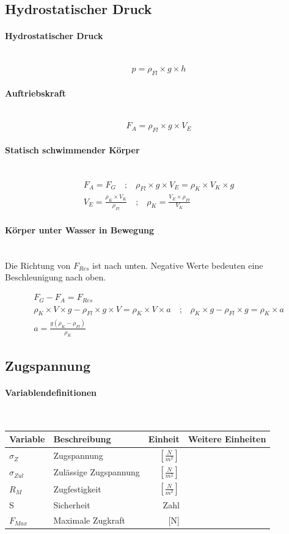 \documentclass[a4paper,10pt]{article}
\newcommand{\lbparagraph}[1]{\paragraph{#1}\mbox{}\\}
\newcommand{\eqsp}[1]{\quad\textbf{;}\quad}
\begin{document}
\subsection{Hydrostatischer Druck}

\lbparagraph{Hydrostatischer Druck}

\begin{equation}
    p = {\rho}_{Fl} \times g \times h
\end{equation}

\lbparagraph{Auftriebskraft}

\begin{equation}
    F_A = {\rho}_{Fl} \times g \times V_E
\end{equation}

\lbparagraph{Statisch schwimmender Körper}

\begin{gather}
    F_A = F_G
    \eqsp{}
    {\rho}_{Fl} \times g \times V_E = {\rho}_K \times V_K \times g
    \\
    V_E = \frac{{\rho}_K \times V_K}{{\rho}_{Fl}}
    \eqsp{}
    {\rho}_K = \frac{V_E \times {\rho}_{Fl}}{V_K}
\end{gather}

\lbparagraph{Körper unter Wasser in Bewegung}

Die Richtung von $F_{Res}$ ist nach unten. Negative Werte bedeuten eine Beschleunigung nach oben.

\begin{gather}
    F_G - F_A = F_{Res}
    \\
    {\rho}_K \times V \times g - {\rho}_{Fl} \times g \times V = {\rho}_K \times V \times a
    \eqsp{}
    {\rho}_K \times g - {\rho}_{Fl} \times g = {\rho}_K\times a
    \\
    a = \frac{g({\rho}_K - {\rho}_{Fl})}{{\rho}_K}
\end{gather}

\subsection{Zugspannung}

\lbparagraph{Variablendefinitionen}

\begin{tabular}{l|l|r|r}
    Variable & Beschreibung & Einheit & Weitere Einheiten \\
    \hline
    ${\sigma}_Z$ & Zugspannung & $[\frac{N}{m^2}]$ & \\
    ${\sigma}_{Zul}$ & Zulässige Zugspannung & $[\frac{N}{m^2}]$ & \\
    $R_M$ & Zugfestigkeit & $[\frac{N}{m^2}]$ & \\
    S & Sicherheit & Zahl & \\
    $F_{Max}$ & Maximale Zugkraft & [N] &
\end{tabular}
\end{document}
